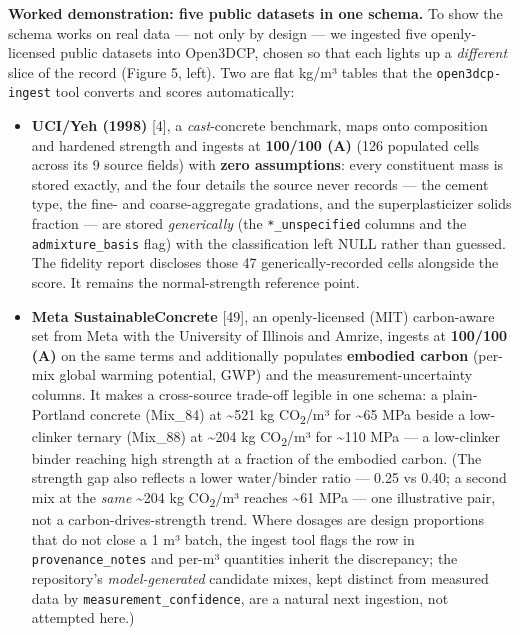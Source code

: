\documentclass[
  11pt,
  letterpaper,
]{article}
\providecommand{\tightlist}{%
  \setlength{\itemsep}{0pt}\setlength{\parskip}{0pt}}
\begin{document}
\textbf{Worked demonstration: five public datasets in one schema.} To
show the schema works on real data --- not only by design --- we
ingested five openly-licensed public datasets into Open3DCP, chosen so
that each lights up a \emph{different} slice of the record (Figure 5,
left). Two are flat kg/m³ tables that the \texttt{open3dcp-ingest} tool
converts and scores automatically:

\begin{itemize}
\tightlist
\item
  \textbf{UCI/Yeh (1998)} {[}4{]}, a \emph{cast}-concrete benchmark,
  maps onto composition and hardened strength and ingests at
  \textbf{100/100 (A)} (126 populated cells across its 9 source fields)
  with \textbf{zero assumptions}: every constituent mass is stored
  exactly, and the four details the source never records --- the cement
  type, the fine- and coarse-aggregate gradations, and the
  superplasticizer solids fraction --- are stored \emph{generically}
  (the \texttt{*\_unspecified} columns and the \texttt{admixture\_basis}
  flag) with the classification left NULL rather than guessed. The
  fidelity report discloses those 47 generically-recorded cells
  alongside the score. It remains the normal-strength reference point.
\item
  \textbf{Meta SustainableConcrete} {[}49{]}, an openly-licensed (MIT)
  carbon-aware set from Meta with the University of Illinois and Amrize,
  ingests at \textbf{100/100 (A)} on the same terms and additionally
  populates \textbf{embodied carbon} (per-mix global warming potential,
  GWP) and the measurement-uncertainty columns. It makes a cross-source
  trade-off legible in one schema: a plain-Portland concrete (Mix\_84)
  at \textasciitilde521 kg CO\textsubscript{2}/m³ for \textasciitilde65
  MPa beside a low-clinker ternary (Mix\_88) at \textasciitilde204 kg
  CO\textsubscript{2}/m³ for \textasciitilde110 MPa --- a low-clinker
  binder reaching high strength at a fraction of the embodied carbon.
  (The strength gap also reflects a lower water/binder ratio --- 0.25 vs
  0.40; a second mix at the \emph{same} \textasciitilde204 kg
  CO\textsubscript{2}/m³ reaches \textasciitilde61 MPa --- one
  illustrative pair, not a carbon-drives-strength trend. Where dosages
  are design proportions that do not close a 1 m³ batch, the ingest tool
  flags the row in \texttt{provenance\_notes} and per-m³ quantities
  inherit the discrepancy; the repository's \emph{model-generated}
  candidate mixes, kept distinct from measured data by
  \texttt{measurement\_confidence}, are a natural next ingestion, not
  attempted here.)
\end{itemize}
\end{document}
